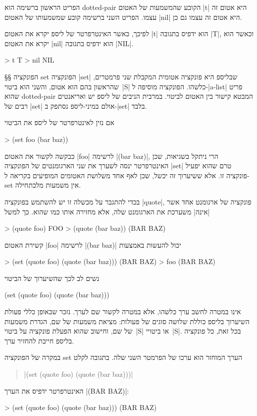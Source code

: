 הפריט הראשון ברשימה הוא dotted-pair הקובע שהמשמעות של האטום \T|t| היא אטום זה
עצמו. הפריט השני ברשימה קובע שמשמעותו של האטום \T|nil| היא אטום זה עצמו גם כן.

לפיכך, כאשר האינטרפרטר של ליספ יקרא את האטום \T|t| הוא ידפיס בתגובה \T|T|,
וכאשר הוא יקרא את האטום \T|nil| הוא ידפיס בתגובה \T|NIL|.
\begin{LISP}
> t
T
> nil
NIL
\end{LISP}

§§ הפונקציה set
הפונקציה \T|set| שבליספ היא פונקציה אטומית המקבלת שני פרמטרים, שהראשון בהם
הוא אטום, והשני הוא ביטוי~\E|S| כלשהו. הפונקציה מוסיפה ל-\E|a-list| פריט שהוא
dotted-pair המבטא קישור בין האטום לביטוי. במרבית הניבים של ליספ יש ואריאנטים
רבים של \T|set| אולם במיני-ליספ נסתפק ב-\T|set| בלבד.

אם נזין לאינטרפרטר של ליספ את הביטוי
\begin{LISP}
> (set foo (bar baz))
\end{LISP}
כבקשה לקשור את האטום \T|foo| לרשימה \T|(bar baz)|, הרי ניתקל בשגיאות, שכן
האינטרפרטר ינסה לשערך את שני הארגומנטים של הפונקציה \E|set| טרם שהוא יפעיל
פונקציה זו. אלא ששיערוך זה יכשל, שכן לאף אחד משלושת האטומים המופיעים בקריאה
ל-set אין משמעות מלכתחילה.

בכדי להתגבר על מכשלה זו יש להשתמש בפונקציה \T|quote|, פונקציה של ארגומנט אחד
אשר \ע|אינה| משערכת את הארגומנט שלה, אלא מחזירה אותו כמו שהוא.
כך למשל
\begin{LISP}
> (quote foo)
FOO
> (quote (bar baz))
(BAR BAZ)
\end{LISP}
קשירת האטום \T|foo| לרשימה \T|(bar baz)| יכול להעשות באמצעות
\begin{LISP}
> (set (quote foo) (quote (bar baz)))
(BAR BAZ)
> foo
(BAR BAZ)
\end{LISP}
נשים לב לכך שהשיערוך של הביטוי
\begin{LISP}
(set (quote foo) (quote (bar baz)))
\end{LISP}
אינו במטרה לחשב ערך כלשהו, אלא במטרה לקשור שם לערך. נזכר שבאופן כללי פעולת
השיערוך בליספ כוללת שלושה סוגים של פעולות: מציאת משמעות של שם, הגדרת משמעות של
שם, וחישוב שהוא הפעלת פונקציה על ביטוי~\E|S| או ביטויי~\E|S|. בכל זאת, כל
פונקציה בליספ חייבת להחזיר ערך.

במקרה של הפונקציה set הערך המוחזר הוא ערכו של הפרמטר השני שלה. בתגובה לקלט
\begin{quote}
\T|(set (quote foo) (quote (bar baz)))|
\end{quote}
האינטרפרטר ידפיס את הערך \T|(BAR BAZ)|:
\begin{LISP}
> (set (quote foo) (quote (bar baz)))
(BAR BAZ)
\end{LISP}

